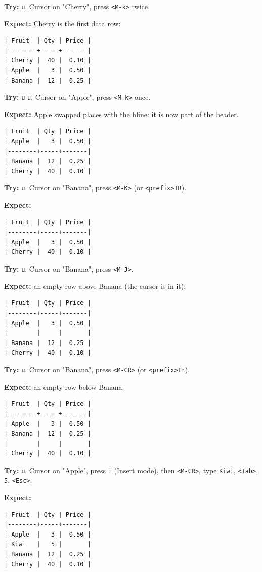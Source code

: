 \textbf{Try:} \texttt{u}. Cursor on "Cherry", press \texttt{<M-k>} twice.

\textbf{Expect:} Cherry is the first data row:
\begin{verbatim}
| Fruit  | Qty | Price |
|--------+-----+-------|
| Cherry |  40 |  0.10 |
| Apple  |   3 |  0.50 |
| Banana |  12 |  0.25 |
\end{verbatim}

\textbf{Try:} \texttt{u} \texttt{u}. Cursor on "Apple", press \texttt{<M-k>} once.

\textbf{Expect:} Apple swapped places with the hline: it is now part of the header.
\begin{verbatim}
| Fruit  | Qty | Price |
| Apple  |   3 |  0.50 |
|--------+-----+-------|
| Banana |  12 |  0.25 |
| Cherry |  40 |  0.10 |
\end{verbatim}

\textbf{Try:} \texttt{u}. Cursor on "Banana", press \texttt{<M-K>} (or \texttt{<prefix>TR}).

\textbf{Expect:}
\begin{verbatim}
| Fruit  | Qty | Price |
|--------+-----+-------|
| Apple  |   3 |  0.50 |
| Cherry |  40 |  0.10 |
\end{verbatim}

\textbf{Try:} \texttt{u}. Cursor on "Banana", press \texttt{<M-J>}.

\textbf{Expect:} an empty row above Banana (the cursor is in it):
\begin{verbatim}
| Fruit  | Qty | Price |
|--------+-----+-------|
| Apple  |   3 |  0.50 |
|        |     |       |
| Banana |  12 |  0.25 |
| Cherry |  40 |  0.10 |
\end{verbatim}

\textbf{Try:} \texttt{u}. Cursor on "Banana", press \texttt{<M-CR>} (or \texttt{<prefix>Tr}).

\textbf{Expect:} an empty row below Banana:
\begin{verbatim}
| Fruit  | Qty | Price |
|--------+-----+-------|
| Apple  |   3 |  0.50 |
| Banana |  12 |  0.25 |
|        |     |       |
| Cherry |  40 |  0.10 |
\end{verbatim}

\textbf{Try:} \texttt{u}. Cursor on "Apple", press \texttt{i} (Insert mode), then \texttt{<M-CR>}, type
\texttt{Kiwi}, \texttt{<Tab>}, \texttt{5}, \texttt{<Esc>}.

\textbf{Expect:}
\begin{verbatim}
| Fruit  | Qty | Price |
|--------+-----+-------|
| Apple  |   3 |  0.50 |
| Kiwi   |   5 |       |
| Banana |  12 |  0.25 |
| Cherry |  40 |  0.10 |
\end{verbatim}
